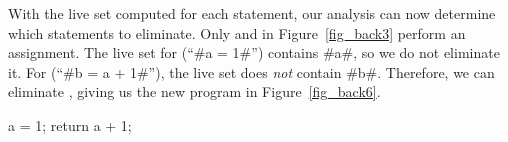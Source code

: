 \documentclass[12pt]{report}
\begin{document}
With the live set computed for each statement, our analysis can now
determine which statements to eliminate. Only
 and  in
Figure~\ref{fig_back3} perform an assignment. The live set for
 (``#a = 1#'') contains #a#, so we do not
eliminate it. For  (``#b = a + 1#''), the
live set does \emph{not} contain #b#. Therefore, we can eliminate
, giving us the new program in
Figure~\ref{fig_back6}.

\begin{myfig}[th]
  \centering
  \begin{minipage}{1in}
  \begin{AVerb}[numbers=left]
a = 1;
return a + 1;
  \end{AVerb}
  \end{minipage}
  \caption{The program from Figure~\ref{fig_back3} with the useless assignment to
    \verb=b= eliminated.}
\end{myfig}





\end{document}
